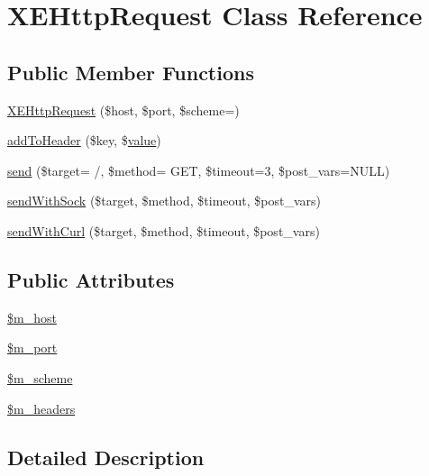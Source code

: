 \hypertarget{classXEHttpRequest}{}\section{X\+E\+Http\+Request Class Reference}
\label{classXEHttpRequest}
\subsection*{Public Member Functions}
\begin{DoxyCompactItemize}
\item 
\hyperlink{classXEHttpRequest_aa8a672ad4e5c3cc8d3b7a9cecc29d349}{X\+E\+Http\+Request} (\$host, \$port, \$scheme=\textquotesingle{}\textquotesingle{})
\item 
\hyperlink{classXEHttpRequest_af936bdc66e6dcabbd8934afc5e210063}{add\+To\+Header} (\$key, \$\hyperlink{common_2js_2jquery_8js_abe5393d870043cf6aaa1d5ad5fce755c}{value})
\item 
\hyperlink{classXEHttpRequest_a8f75aef64b09a7b2d007bdce562eaaf6}{send} (\$target= \textquotesingle{}/\textquotesingle{}, \$method= \textquotesingle{}G\+ET\textquotesingle{}, \$timeout=3, \$post\+\_\+vars=N\+U\+LL)
\item 
\hyperlink{classXEHttpRequest_a9e316ec4c68dfe9a124327287dae2754}{send\+With\+Sock} (\$target, \$method, \$timeout, \$post\+\_\+vars)
\item 
\hyperlink{classXEHttpRequest_ae6412b6f079b88a67f43602d3cdae2d7}{send\+With\+Curl} (\$target, \$method, \$timeout, \$post\+\_\+vars)
\end{DoxyCompactItemize}
\subsection*{Public Attributes}
\begin{DoxyCompactItemize}
\item 
\hyperlink{classXEHttpRequest_ad88148dced2b42017a96b2a5dd0b533a}{\$m\+\_\+host}
\item 
\hyperlink{classXEHttpRequest_a35c62f61b5ad2c200c53a58dd43a2784}{\$m\+\_\+port}
\item 
\hyperlink{classXEHttpRequest_a501919f00934ef2cc76300fa32c2f19d}{\$m\+\_\+scheme}
\item 
\hyperlink{classXEHttpRequest_a36df236b46af2f09dd9020096dbaed22}{\$m\+\_\+headers}
\end{DoxyCompactItemize}


\subsection{Detailed Description}


